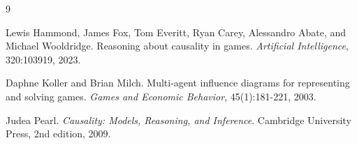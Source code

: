 \documentclass{article}
\begin{document}
\begin{thebibliography}{9}

Lewis Hammond, James Fox, Tom Everitt, Ryan Carey, Alessandro Abate, and Michael Wooldridge.
\newblock Reasoning about causality in games.
\newblock \emph{Artificial Intelligence}, 320:103919, 2023.

Daphne Koller and Brian Milch.
\newblock Multi-agent influence diagrams for representing and solving games.
\newblock \emph{Games and Economic Behavior}, 45(1):181-221, 2003.

Judea Pearl.
\newblock \emph{Causality: Models, Reasoning, and Inference}.
\newblock Cambridge University Press, 2nd edition, 2009.

\end{thebibliography}
\end{document}
